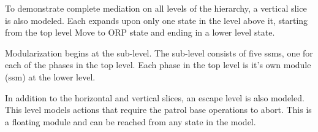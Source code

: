 \documentclass[../../main/main.tex]{subfiles}
\begin{document}
To demonstrate complete mediation on all levels of the hierarchy, a vertical slice is also modeled.  Each  expands upon only one state in the level above it, starting from the top level Move to ORP state and ending in a lower level state. 

Modularization begins at the sub-level.  The sub-level consists of five \gls{ssm}s, one for each of the phases in the top level.  Each phase in the top level is it's own module (\gls{ssm}) at the lower level.  


%

In addition to the horizontal and vertical slices, an escape level is also modeled.  This level models actions that require the patrol base operations to abort.  This is a floating module and can be reached from any state in the model.  


\end{document}
